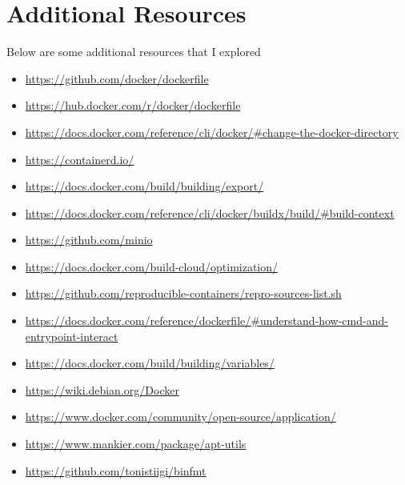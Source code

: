 \documentclass{article}
\begin{document}
\section{Additional Resources}
Below are some additional resources that I explored

\begin{itemize}
  \item \href{https://github.com/docker/dockerfile}{https://github.com/docker/dockerfile}
  \item \href{https://hub.docker.com/r/docker/dockerfile}{https://hub.docker.com/r/docker/dockerfile}
  \item \href{https://docs.docker.com/reference/cli/docker/\#change-the-docker-directory}{https://docs.docker.com/reference/cli/docker/\#change-the-docker-directory}
  \item \href{https://containerd.io/}{https://containerd.io/}
  \item \href{https://docs.docker.com/build/building/export/}{https://docs.docker.com/build/building/export/}
  \item \href{https://docs.docker.com/reference/cli/docker/buildx/build/\#build-context}{https://docs.docker.com/reference/cli/docker/buildx/build/\#build-context}
  \item \href{https://github.com/minio}{https://github.com/minio}
  \item \href{https://docs.docker.com/build-cloud/optimization/}{https://docs.docker.com/build-cloud/optimization/}
  \item \href{https://github.com/reproducible-containers/repro-sources-list.sh}{https://github.com/reproducible-containers/repro-sources-list.sh}
  \item \href{https://docs.docker.com/reference/dockerfile/\#understand-how-cmd-and-entrypoint-interact}{https://docs.docker.com/reference/dockerfile/\#understand-how-cmd-and-entrypoint-interact}
  \item \href{https://docs.docker.com/build/building/variables/}{https://docs.docker.com/build/building/variables/}
  \item \href{https://wiki.debian.org/Docker}{https://wiki.debian.org/Docker}
  \item \href{https://www.docker.com/community/open-source/application/}{https://www.docker.com/community/open-source/application/}
  \item \href{https://www.mankier.com/package/apt-utils}{https://www.mankier.com/package/apt-utils}
  \item \href{https://github.com/tonistiigi/binfmt}{https://github.com/tonistiigi/binfmt}

\end{itemize}
\end{document}
